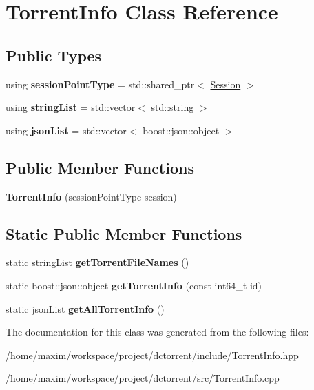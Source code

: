 \hypertarget{class_torrent_info}{}\section{Torrent\+Info Class Reference}
\label{class_torrent_info}
\subsection*{Public Types}
\begin{DoxyCompactItemize}
\item 
\mbox{\label{class_torrent_info_a48ea7d5033a3cbe98af5c335dc1a4747}} 
using {\bfseries session\+Point\+Type} = std\+::shared\+\_\+ptr$<$ \hyperlink{class_session}{Session} $>$
\item 
\mbox{\label{class_torrent_info_a61cc54f994d201a10eeec77d5bca88bb}} 
using {\bfseries string\+List} = std\+::vector$<$ std\+::string $>$
\item 
\mbox{\label{class_torrent_info_aa50ef897a74c15383ca2be3b7e7cc84f}} 
using {\bfseries json\+List} = std\+::vector$<$ boost\+::json\+::object $>$
\end{DoxyCompactItemize}
\subsection*{Public Member Functions}
\begin{DoxyCompactItemize}
\item 
\mbox{\label{class_torrent_info_ad1951d38efaed083fa99acb1791ebeb5}} 
{\bfseries Torrent\+Info} (session\+Point\+Type session)
\end{DoxyCompactItemize}
\subsection*{Static Public Member Functions}
\begin{DoxyCompactItemize}
\item 
\mbox{\label{class_torrent_info_a2e780e998c0056fcd9cb5fe487a5fe82}} 
static string\+List {\bfseries get\+Torrent\+File\+Names} ()
\item 
\mbox{\label{class_torrent_info_a044027a0abb8666449b8f5b839649242}} 
static boost\+::json\+::object {\bfseries get\+Torrent\+Info} (const int64\+\_\+t id)
\item 
\mbox{\label{class_torrent_info_a83bfa2e026eddc44ae747aaf312b8d6a}} 
static json\+List {\bfseries get\+All\+Torrent\+Info} ()
\end{DoxyCompactItemize}


The documentation for this class was generated from the following files\+:\begin{DoxyCompactItemize}
\item 
/home/maxim/workspace/project/dctorrent/include/Torrent\+Info.\+hpp\item 
/home/maxim/workspace/project/dctorrent/src/Torrent\+Info.\+cpp\end{DoxyCompactItemize}
